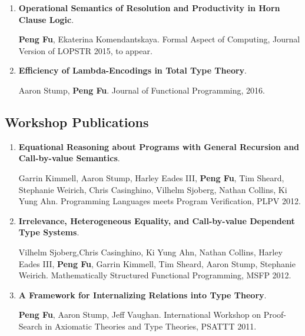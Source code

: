 \documentclass{article}
\begin{document}
  
\begin{enumerate}
  \item \textbf{Operational Semantics of Resolution and Productivity in Horn Clause Logic}. 
  
  \textbf{Peng Fu}, Ekaterina Komendantskaya. Formal Aspect of Computing, Journal Version of LOPSTR 2015, to appear. 

\item \textbf{Efficiency of Lambda-Encodings in Total Type Theory}. 
  
  Aaron Stump, \textbf{Peng Fu}.  Journal of Functional Programming, 2016.
\end{enumerate}


\subsection*{Workshop Publications}
\begin{enumerate}
  \item { \textbf{Equational Reasoning about Programs with General Recursion and Call-by-value Semantics}}. 
  
  Garrin Kimmell, Aaron Stump, Harley Eades III, \textbf{Peng Fu}, Tim Sheard, Stephanie Weirich, Chris Casinghino, Vilhelm Sjoberg, Nathan Collins, Ki Yung Ahn. Programming Languages meets Program Verification, PLPV 2012. 
\item { \textbf{Irrelevance, Heterogeneous Equality, and Call-by-value Dependent Type Systems}. }
  
  Vilhelm Sjoberg,Chris Casinghino, Ki Yung Ahn, Nathan Collins, Harley Eades III, \textbf{Peng Fu}, Garrin Kimmell, Tim Sheard, Aaron Stump, Stephanie Weirich.  Mathematically Structured Functional
Programming, MSFP 2012.


  \item \textbf{A Framework for Internalizing Relations into Type Theory}. 

    \textbf{Peng Fu}, Aaron Stump, Jeff Vaughan. International Workshop on Proof-Search in Axiomatic Theories and Type Theories, PSATTT 2011.

\end{enumerate}  

  
  
  
\end{document}
